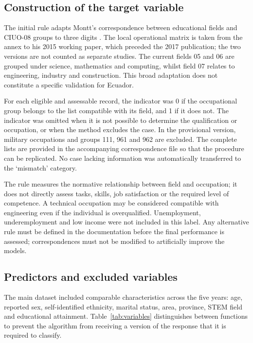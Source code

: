 \subsection{Construction of the target variable}



The initial rule adapts Montt's correspondence between educational fields and CIUO-08 groups to three digits \cite{Montt2017}. The local operational matrix is taken from the annex to his 2015 working paper, which preceded the 2017 publication; the two versions are not counted as separate studies. The current fields 05 and 06 are grouped under science, mathematics and computing, whilst field 07 relates to engineering, industry and construction. This broad adaptation does not constitute a specific validation for Ecuador.


For each eligible and assessable record, the indicator was 0 if the occupational group belongs to the list compatible with its field, and 1 if it does not. The indicator was omitted when it is not possible to determine the qualification or occupation, or when the method excludes the case. In the provisional version, military occupations and groups 111, 961 and 962 are excluded. The complete lists are provided in the accompanying correspondence file so that the procedure can be replicated. No case lacking information was automatically transferred to the `mismatch' category.


The rule measures the normative relationship between field and occupation; it does not directly assess tasks, skills, job satisfaction or the required level of competence. A technical occupation may be considered compatible with engineering even if the individual is overqualified. Unemployment, underemployment and low income were not included in this label. Any alternative rule must be defined in the documentation before the final performance is assessed; correspondences must not be modified to artificially improve the models.

\subsection{Predictors and excluded variables}



The main dataset included comparable characteristics across the five years: age, reported sex, self-identified ethnicity, marital status, area, province, STEM field and educational attainment. Table~\ref{tab:variables} distinguishes between functions to prevent the algorithm from receiving a version of the response that it is required to classify.

